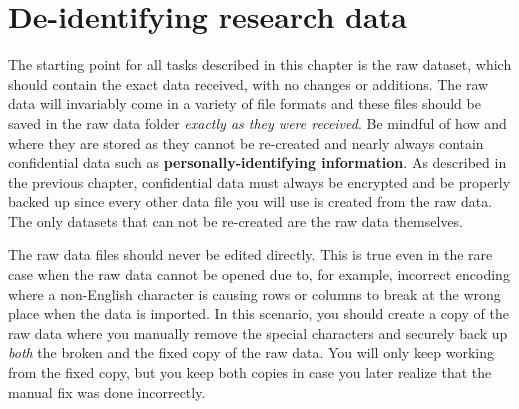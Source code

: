 
\section{De-identifying research data}

The starting point for all tasks described in this chapter is the raw dataset,
which should contain the exact data received, with no changes or additions.
The raw data will invariably come in a variety of file formats and these files
should be saved in the raw data folder \textit{exactly as they were
received}. Be mindful of how and where they are stored as they cannot be
re-created and nearly always contain confidential data such as
\textbf{personally-identifying information}.
As described in the previous chapter, confidential data must always be
encrypted and be
properly backed up since every other data file you will use is created from the
raw data. The only datasets that can not be re-created are the raw data
themselves.

The raw data files should never be edited directly. This is true even in the
rare case when the raw data cannot be opened due to, for example, incorrect
encoding where a non-English character is causing rows or columns to break at the
wrong place when the data is imported. In this scenario, you should create a
copy of the raw data where you manually remove the special characters and
securely back up \textit{both} the broken and the fixed copy of the raw data.
You will only keep working from the fixed copy, but you keep both copies in
case you later realize that the manual fix was done incorrectly.

